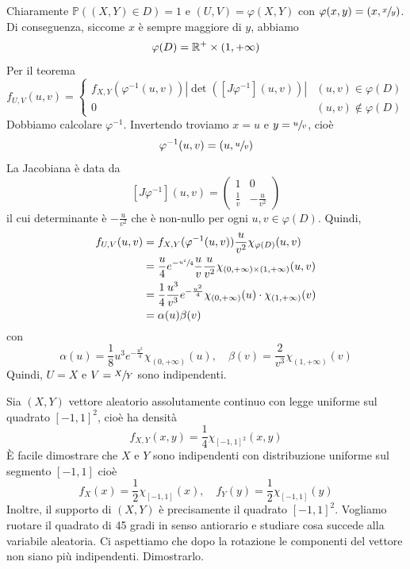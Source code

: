 \documentclass[a4paper]{article}
\begin{document}
\begin{snippetsolution}{}
\begin{enumerate}
            Chiaramente \(\mathbb P((X,Y) \in D) = 1\) e \((U,V) = \varphi(X,Y)\)
            con \(\varphi(x,y) = (x, \sfrac xy)\). Di conseguenza,
            siccome \(x\) è sempre maggiore di \(y\), abbiamo
            \[
                \varphi(D) = \mathbb{R}^+ \times (1, +\infty)
            \]
            Per il teorema \[
                f_{U,V}(u,v) =
                \begin{cases}
                    f_{X,Y}(\varphi^{-1}(u,v))|\det([J\varphi^{-1}](u,v))| & (u,v) \in \varphi(D) \\
                    0 & (u,v) \notin \varphi(D)
                \end{cases}
            \]
            Dobbiamo calcolare \(\varphi^{-1}\). Invertendo troviamo \(x=u\) e \(y = \sfrac uv\),
            cioè \[
                \varphi^{-1}(u,v) = \left(u, \sfrac uv\right)
            \]
            La Jacobiana è data da \[
                [J \varphi^{-1}](u,v) =
                \begin{pmatrix}
                    1 & 0 \\ \frac{1}{v} & -\frac{u}{v^2}
                \end{pmatrix}
            \]
            il cui determinante è \(- \frac{u}{v^2}\) che è non-nullo per ogni \(u,v \in \varphi(D)\).
            Quindi,
            \begin{align*}
                f_{U,V}(u,v) &= f_{X,Y}(\varphi^{-1}(u,v)) \frac{u}{v^2} \chi_{\varphi(D)}(u,v) \\
                &= \frac{u}{4} e^{-\sfrac{u^2}{4}} \frac{u}{v} \frac{u}{v^2} \chi_{
                    (0,+\infty) \times (1,+\infty)
                }(u,v) \\
                &= \frac 14 \frac{u^3}{v^3} e^{-\frac{u^2}{4}}
                \chi_{(0,+\infty)}(u) \cdot \chi_{(1,+\infty)}(v) \\
                &= \alpha(u) \beta(v)
            \end{align*}
            con \[
                \alpha(u) = \frac{1}{8}u^3 e^{-\frac{u^2}{4}} \chi_{(0,+\infty)}(u), \quad
                \beta(v) = \frac{2}{v^3}\chi_{(1,+\infty)}(v)
            \]
            Quindi, \(U=X\) e \(V = \sfrac XY\) sono indipendenti.
    \end{enumerate}
\end{snippetsolution}

\begin{snippetexercise}{}
    Sia \((X,Y)\) vettore aleatorio assolutamente continuo con legge uniforme sul quadrato
    \([-1,1]^2\), cioè ha densità \[
        f_{X,Y}(x,y) = \frac 14 \chi_{[-1,1]^2}(x,y)
    \]
    È facile dimostrare che \(X\) e \(Y\) sono indipendenti con
    distribuzione uniforme sul segmento \([-1, 1]\) cioè \[
        f_X(x) = \frac12 \chi_{[-1,1]}(x),\quad
        f_Y(y) = \frac12 \chi_{[-1,1]}(y)
    \]
    Inoltre, il supporto di \((X,Y)\) è precisamente il quadrato \([-1,1]^2\).
    Vogliamo ruotare il quadrato di 45 gradi in senso antiorario e studiare cosa succede alla variabile aleatoria.
    Ci aspettiamo che dopo la rotazione le componenti del vettore non siano più indipendenti. Dimostrarlo.
\end{snippetexercise}
\end{document}
